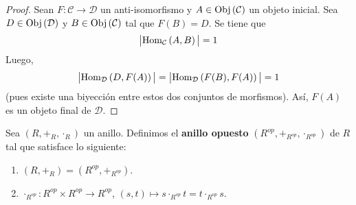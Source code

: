 \documentclass[12pt]{report}
\newcounter{it}
\theoremstyle{largebreak}
\newcommand\abs[1]{\ensuremath{\big|#1\big|}}
\newcommand\cf[3]{\ensuremath{#1:#2\rightarrow#3}}
\newcommand{\Obj}[1]{\ensuremath{\textup{Obj}\left(#1\right)}}
\newcommand{\Hom}[3]{\ensuremath{\textup{Hom}_{#1}\left(#2,#3\right)}}
\begin{document}
    \begin{proof}
        Sean $\cf{F}{\mathcal{C}}{\mathcal{D}}$ un anti-isomorfismo y $A\in\Obj{\mathcal{C}}$ un objeto inicial. Sea $D\in\Obj{\mathcal{D}}$ y $B\in\Obj{\mathcal{C}}$ tal que $F(B)=D$. Se tiene que
        \begin{equation*}
            \abs{\Hom{\mathcal{C}}{A}{B}}=1
        \end{equation*}
        Luego,
        \begin{equation*}
            \abs{\Hom{\mathcal{D}}{D}{F(A)}}=\abs{\Hom{\mathcal{D}}{F(B)}{F(A)}}=1
        \end{equation*}
        (pues existe una biyección entre estos dos conjuntos de morfismos). Así, $F(A)$ es un objeto final de $\mathcal{D}$.
    \end{proof}

    \begin{mydef}
        Sea $(R,+_R,\cdot_R)$ un anillo. Definimos el \textbf{anillo opuesto} $(R^{op},+_{ R^{op}},\cdot_{ R^{op}})$ de $R$ tal que satisface lo siguiente:
        \begin{enumerate}
            \item $(R,+_R)=(R^{op},+_{R^{op}})$.
            \item $\cf{\cdot_{R^{op}}}{R^{op}\times R^{op}}{R^{op}}$, $(s,t)\mapsto s\cdot_{R^{op}}t=t\cdot_{R^{op}}s$.
        \end{enumerate}
    \end{mydef}
\end{document}
